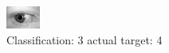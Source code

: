 \begin{figure}[h!]
\begin{center}
\includegraphics[width=0.60\columnwidth]{figures/ID733_class_3_target_4.png}
\end{center}
\caption{ Classification: 3 actual target: 4}
\label{fig:ID733_class_3_target_4}
\end{figure}
